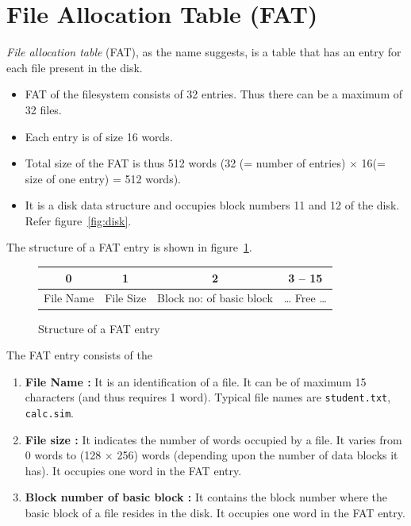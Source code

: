 \section{File Allocation Table (FAT)}
\label{sec:fat}
\label{lbl:fat}
\emph{File allocation table} (FAT), as the name suggests, is a table that has an entry for each file present in the disk.
\begin{itemize}
	\item FAT of the filesystem consists of 32 entries. Thus there can be a maximum of 32 files. 
	\item Each entry is of size 16 words.
	\item Total size of the FAT is thus 512 words (32 (= number of entries) $\times$ 16(= size of one entry) = 512 words).
	\item It is a disk data structure and occupies block numbers 11 and 12 of the disk. Refer figure~\ref{fig:disk}. 
\end{itemize}

The structure of a FAT entry is shown in figure~\ref{fig:fat_entry}. 

\begin{figure}[htp!] \small
	\centering
	\begin{tabular}{|c|c|c|c|}
		\hline
		0 & 1 & 2 & 3 -- 15 \\
		\hline
		File Name & File Size & Block no: of basic block & \dots{} Free \dots \\
		\hline
	\end{tabular}
	\caption{Structure of a FAT entry}
	\label{fig:fat_entry}
\end{figure}

The FAT entry consists of the
\begin{enumerate}
	\item \textbf{File Name :} It is an identification of a file. It can be of maximum 15 characters (and thus requires 1 word). Typical file names are \texttt{student.txt}, \texttt{calc.sim}.
	\item \textbf{File size :} It indicates the number of words occupied by a file. It varies from 0 words to (128 $\times$ 256) words (depending upon the number of data blocks it has). It occupies one word in the FAT entry.
	\item \textbf{Block number of basic block :} It contains the block number where the basic block of a file resides in the disk. It occupies one word in the FAT entry.
\end{enumerate}


